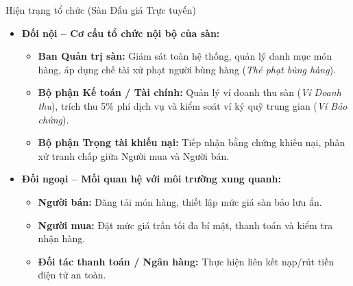 \documentclass[aspectratio=169, 10pt]{beamer}
\begin{document}
\begin{frame}{Hiện trạng tổ chức (Sàn Đấu giá Trực tuyến)}
    \begin{itemize}
        \item \textbf{Đối nội -- Cơ cấu tổ chức nội bộ của sàn:}
        \begin{itemize}
            \item \textbf{Ban Quản trị sàn:} Giám sát toàn hệ thống, quản lý danh mục món hàng, áp dụng chế tài xử phạt người bùng hàng (\textit{Thẻ phạt bùng hàng}).
            \item \textbf{Bộ phận Kế toán / Tài chính:} Quản lý ví doanh thu sàn (\textit{Ví Doanh thu}), trích thu 5\% phí dịch vụ và kiểm soát ví ký quỹ trung gian (\textit{Ví Bảo chứng}).
            \item \textbf{Bộ phận Trọng tài khiếu nại:} Tiếp nhận bằng chứng khiếu nại, phân xử tranh chấp giữa Người mua và Người bán.
        \end{itemize}
        \vspace{0.3cm}
        \item \textbf{Đối ngoại -- Mối quan hệ với môi trường xung quanh:}
        \begin{itemize}
            \item \textbf{Người bán:} Đăng tải món hàng, thiết lập mức giá sàn bảo lưu ẩn.
            \item \textbf{Người mua:} Đặt mức giá trần tối đa bí mật, thanh toán và kiểm tra nhận hàng.
            \item \textbf{Đối tác thanh toán / Ngân hàng:} Thực hiện liên kết nạp/rút tiền điện tử an toàn.
        \end{itemize}
    \end{itemize}
\end{frame}
\end{document}
